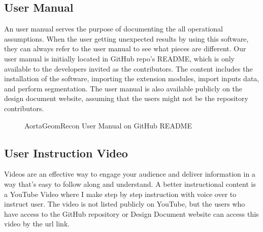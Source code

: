 \subsection{User Manual}
An user manual serves the purpose of documenting the all operational assumptions. When the user getting unexpected results by using this software, they can always refer to the user manual to see what pieces are different. Our user manual is initially located in GitHub repo's README, which is only available to the developers invited as the contributors. The content includes the installation of the software, importing the extension modules, import inputs data, and perform segmentation. The user manual is also available publicly on the design document website, assuming that the users might not be the repository contributors.

\begin{figure}[H]
    \centering
    \caption[AortaGeomRecon User Manual on GitHub README]{AortaGeomRecon User Manual on GitHub README}
    \label{fig_agr_git_um}
\end{figure}


\subsection{User Instruction Video}
Videos are an effective way to engage your audience and deliver information in a way that's easy to follow along and understand. A better instructional content is a YouTube Video where I make step by step instruction with voice over to instruct user. The video is not listed publicly on YouTube, but the users who have access to the GitHub repository or Design Document website can access this video by the url link.


